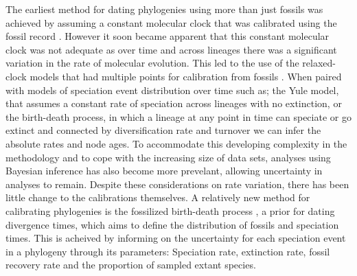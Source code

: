 \documentclass[11pt,letterpaper]{article}
\begin{document}
The earliest method for dating phylogenies using more than just fossils was achieved by assuming a constant molecular clock that was calibrated using the fossil record \citep{zuckerkandl1962molecular}. %
However it soon became apparent that this constant molecular clock was not adequate as over time and across lineages there was a significant variation in the rate of molecular evolution.
This led to the use of the relaxed-clock models that had multiple points for calibration from fossils \citep{drummond2006relaxed}.
When paired with models of speciation event distribution over time such as; the Yule model, that assumes a constant rate of speciation across lineages with no extinction, \citep{yule1925mathematical} or the birth-death process, in which a lineage at any point in time can speciate or go extinct and connected by diversification rate and turnover \citep{kendall1948generalized} we can infer the absolute rates and node ages.
To accommodate this developing complexity in the methodology and to cope with the increasing size of data sets, analyses using Bayesian inference has also become more prevelant, allowing uncertainty in analyses to remain.
Despite these considerations on rate variation, there has been little change to the calibrations themselves.
A relatively new method for calibrating phylogenies is the fossilized birth-death process \citep{heath2014fossilized}, a prior for dating divergence times, which aims to define the distribution of fossils and speciation times.
This is acheived by informing on the uncertainty for each speciation event in a phylogeny through its parameters: Speciation rate, extinction rate, fossil recovery rate and the proportion of sampled extant species.%
\end{document}

